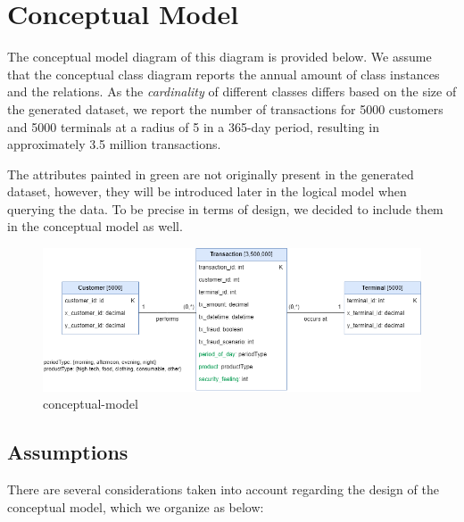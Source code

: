     \hypertarget{conceptual-model}{%
\section{Conceptual Model}\label{conceptual-model}}

    The conceptual model diagram of this diagram is provided below. We
assume that the conceptual class diagram reports the annual amount of
class instances and the relations. As the \emph{cardinality} of
different classes differs based on the size of the generated dataset, we
report the number of transactions for 5000 customers and 5000 terminals
at a radius of 5 in a 365-day period, resulting in approximately 3.5
million transactions.

The attributes painted in green are not originally present in the
generated dataset, however, they will be introduced later in the logical
model when querying the data. To be precise in terms of design, we
decided to include them in the conceptual model as well.

\begin{figure}
\centering
\includegraphics{images/conceptual-model.png}
\caption{conceptual-model}
\end{figure}

    \hypertarget{assumptions}{%
\subsection{Assumptions}\label{assumptions}}

    There are several considerations taken into account regarding the design
of the conceptual model, which we organize as below:

